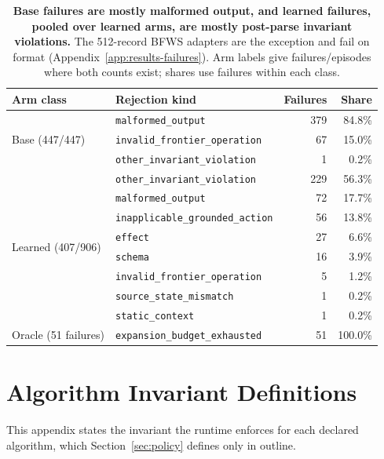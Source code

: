 \begin{table}[t]
\caption{\textbf{Base failures are mostly malformed output, and learned failures, pooled over learned arms, are mostly post-parse invariant violations.} The 512-record BFWS adapters are the exception and fail on format (Appendix~\ref{app:results-failures}). Arm labels give failures/episodes where both counts exist; shares use failures within each class.}
\label{tab:appendix-rejection}
\centering\footnotesize
\setlength{\tabcolsep}{4pt}
\begin{tabular}{llrr}
\toprule[0.4mm]
\rowcolor{mygray}\textbf{Arm class} & \textbf{Rejection kind} & \textbf{Failures} & \textbf{Share} \\
\midrule
\multirow{3}{*}{Base (447/447)} & \texttt{malformed\_output} & 379 & 84.8\% \\
 & \texttt{invalid\_frontier\_operation} & 67 & 15.0\% \\
 & \texttt{other\_invariant\_violation} & 1 & 0.2\% \\
\midrule
\multirow{8}{*}{Learned (407/906)} & \texttt{other\_invariant\_violation} & 229 & 56.3\% \\
 & \texttt{malformed\_output} & 72 & 17.7\% \\
 & \texttt{inapplicable\_grounded\_action} & 56 & 13.8\% \\
 & \texttt{effect} & 27 & 6.6\% \\
 & \texttt{schema} & 16 & 3.9\% \\
 & \texttt{invalid\_frontier\_operation} & 5 & 1.2\% \\
 & \texttt{source\_state\_mismatch} & 1 & 0.2\% \\
 & \texttt{static\_context} & 1 & 0.2\% \\
\midrule
Oracle (51 failures) & \texttt{expansion\_budget\_exhausted} & 51 & 100.0\% \\
\bottomrule
\end{tabular}
\end{table}


\section{Algorithm Invariant Definitions}
\label{app:invariants}

This appendix states the invariant the runtime enforces for each declared algorithm, which Section~\ref{sec:policy} defines only in outline.

